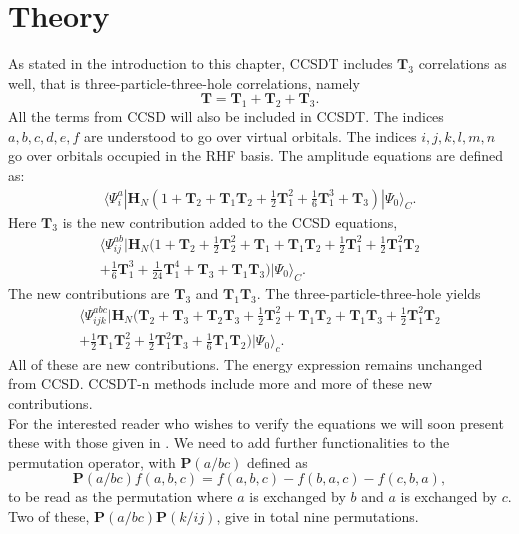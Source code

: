 \section{Theory}
As stated in the introduction to this chapter, CCSDT includes $\textbf{T}_3$ correlations as well, that is three-particle-three-hole correlations, namely
\begin{equation}
\textbf{T} = \textbf{T}_1 + \textbf{T}_2 + \textbf{T}_3 .
\end{equation}
All the terms from CCSD will also be included in CCSDT. The indices
$a,b,c,d,e,f$ are understood to go over virtual orbitals. The indices
$i,j,k,l,m,n$ go over orbitals occupied in the RHF basis. The amplitude
equations are defined as:
\begin{align}
\langle \Psi_i^a | \textbf{H}_N (1 + \textbf{T}_2 + \textbf{T}_1 \textbf{T}_2 + \frac{1}{2} \textbf{T}_1^2 + \frac{1}{6} \textbf{T}_1^3 + \textbf{T}_3) | \Psi_0 \rangle_C .
\end{align}
Here $\textbf{T}_3$ is the new contribution added to the CCSD equations,
\begin{align}
\langle \Psi_{ij}^{ab} | \textbf{H}_N (
1 + \textbf{T}_2 + \frac{1}{2} \textbf{T}_2^2
+ \textbf{T}_1 + \textbf{T}_1 \textbf{T}_2 + \frac{1}{2} \textbf{T}_1^2 
+ \frac{1}{2} \textbf{T}_1^2 \textbf{T}_2 \nonumber \\
+ \frac{1}{6} \textbf{T}_1^3 + \frac{1}{24} \textbf{T}_1^4 + \textbf{T}_3 + \textbf{T}_1 \textbf{T}_3) | \Psi_0 \rangle_C .
\end{align}
The new contributions are $\textbf{T}_3$ and $\textbf{T}_1 \textbf{T}_3$. The three-particle-three-hole yields
\begin{align}
\langle \Psi_{ijk}^{abc} | \textbf{H}_N (
\textbf{T}_2 + \textbf{T}_3 + \textbf{T}_2 \textbf{T}_3 + \frac{1}{2} \textbf{T}_2^2
+ \textbf{T}_1 \textbf{T}_2 + \textbf{T}_1 \textbf{T}_3 + \frac{1}{2} \textbf{T}_1^2 \textbf{T}_2 
\nonumber \\
+ \frac{1}{2} \textbf{T}_1 \textbf{T}_2^2 + \frac{1}{2} \textbf{T}_1^2 \textbf{T}_3 + \frac{1}{6} \textbf{T}_1 \textbf{T}_2) | \Psi_0 \rangle_c .
\end{align}
All of these are new contributions. The energy expression remains
unchanged from CCSD. CCSDT-n methods include more and more of these
new contributions. \\

For the interested reader who wishes to verify the equations we will
soon present these with those given in \cite{CCSDT-ref4}. We need to add further functionalities to the permutation operator, with
$\textbf{P}(a/bc)$ defined as
\begin{equation}
\textbf{P}(a/bc) f(a,b,c) = f(a,b,c) - f(b,a,c) - f(c,b,a),
\end{equation}
to be read as the permutation where $a$ is exchanged by $b$ and $a$ is exchanged by $c$. 
Two of these,  $\textbf{P}(a/bc) \textbf{P}(k/ij)$, give in total nine permutations. \\

